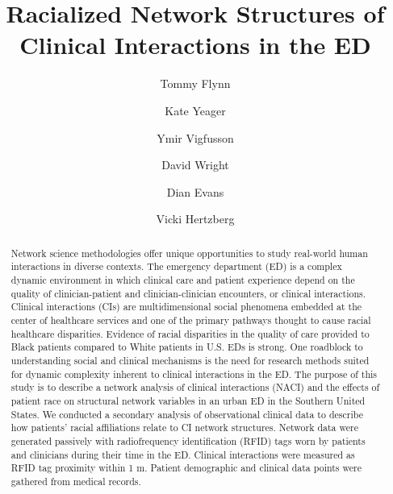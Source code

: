 \documentclass[]{elsarticle} %
\begin{document}
\begin{frontmatter}

  \title{Racialized Network Structures of Clinical Interactions in the
ED}
    \author[Emory University]{Tommy Flynn}
    \author[Emory University]{Kate Yeager}
    \author[Emory University]{Ymir Vigfusson}
    \author[Emory University]{David Wright}
    \author[Emory University]{Dian Evans}
    \author[Emory University]{Vicki Hertzberg}
      \address[Emory University]{1520 Clifton Rd, Atlanta, GA, 30322}
  
  \begin{abstract}
  Network science methodologies offer unique opportunities to study
  real-world human interactions in diverse contexts. The emergency
  department (ED) is a complex dynamic environment in which clinical
  care and patient experience depend on the quality of clinician-patient
  and clinician-clinician encounters, or clinical interactions. Clinical
  interactions (CIs) are multidimensional social phenomena embedded at
  the center of healthcare services and one of the primary pathways
  thought to cause racial healthcare disparities. Evidence of racial
  disparities in the quality of care provided to Black patients compared
  to White patients in U.S. EDs is strong. One roadblock to
  understanding social and clinical mechanisms is the need for research
  methods suited for dynamic complexity inherent to clinical
  interactions in the ED. The purpose of this study is to describe a
  network analysis of clinical interactions (NACI) and the effects of
  patient race on structural network variables in an urban ED in the
  Southern United States. We conducted a secondary analysis of
  observational clinical data to describe how patients' racial
  affiliations relate to CI network structures. Network data were
  generated passively with radiofrequency identification (RFID) tags
  worn by patients and clinicians during their time in the ED. Clinical
  interactions were measured as RFID tag proximity within 1 m. Patient
  demographic and clinical data points were gathered from medical
  records.
  \end{abstract}
  
 \end{frontmatter}
\end{document}
